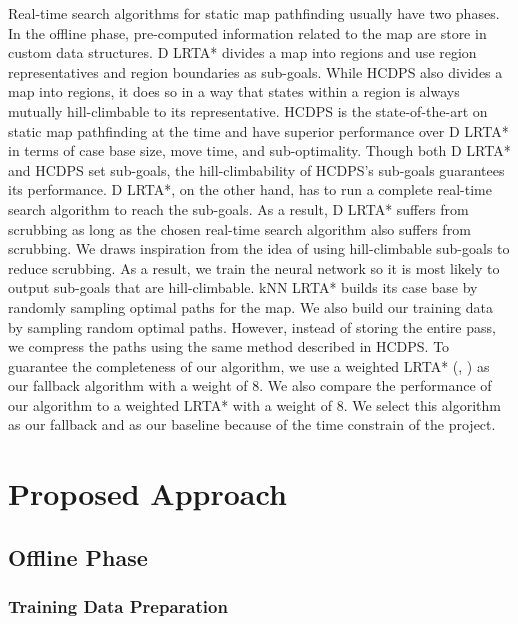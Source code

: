 \documentclass[letterpaper]{article}
\newcommand{\citea}[1]{(\citeauthor{#1}, \citeyear{#1})}
\numberwithin{equation}{section}
\numberwithin{theorem}{section}
\numberwithin{lemma}{section}
\numberwithin{df}{section}
\begin{document}
    Real-time search algorithms for static map pathfinding usually have two phases.
    In the offline phase, pre-computed information related to the map are store in custom data structures.
    D LRTA* divides a map into regions and use region representatives and region boundaries as sub-goals.
    While HCDPS also divides a map into regions, it does so in a way that states within a region is always mutually hill-climbable to its representative.
    HCDPS is the state-of-the-art on static map pathfinding at the time and have superior performance over D LRTA* in terms of case base size, move time, and sub-optimality.
    Though both D LRTA* and HCDPS set sub-goals, the hill-climbability of HCDPS's sub-goals guarantees its performance.
    D LRTA*, on the other hand, has to run a complete real-time search algorithm to reach the sub-goals.
    As a result, D LRTA* suffers from scrubbing as long as the chosen real-time search algorithm also suffers from scrubbing.
    We draws inspiration from the idea of using hill-climbable sub-goals to reduce scrubbing.
    As a result, we train the neural network so it is most likely to output sub-goals that are hill-climbable.
    kNN LRTA* builds its case base by randomly sampling optimal paths for the map.
    We also build our training data by sampling random optimal paths.
    However, instead of storing the entire pass, we compress the paths using the same method described in HCDPS.
    To guarantee the completeness of our algorithm, we use a weighted LRTA* \citea{wlrta} as our fallback algorithm with a weight of 8.
    We also compare the performance of our algorithm to a weighted LRTA* with a weight of 8.
    We select this algorithm as our fallback and as our baseline because of the time constrain of the project.


    \section{Proposed Approach}\label{sec:proposed-approach}

    \subsection{Offline Phase}

    \subsubsection{Training Data Preparation}
\end{document}
